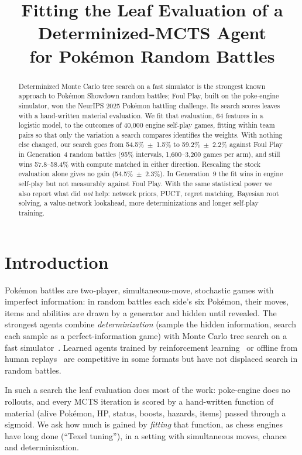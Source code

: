 \documentclass[conference]{IEEEtran}
\begin{document}
\title{Fitting the Leaf Evaluation of a Determinized-MCTS Agent\\for Pok\'emon Random Battles}
\author{}
\maketitle

\begin{abstract}
Determinized Monte Carlo tree search on a fast simulator is the strongest known approach to Pok\'emon Showdown
random battles; Foul Play, built on the poke-engine simulator, won the NeurIPS 2025 Pok\'emon battling challenge.
Its search scores leaves with a hand-written material evaluation. We fit that evaluation, 64 features in a
logistic model, to the outcomes of 40{,}000 engine self-play games, fitting within team pairs so that only the
variation a search compares identifies the weights. With nothing else changed, our search goes from
54.5\%~$\pm$~1.5\% to 59.2\%~$\pm$~2.2\% against Foul Play in Generation~4 random battles (95\% intervals,
1{,}600--3{,}200 games per arm), and still wins 57.8--58.4\% with compute matched in either direction. Rescaling
the stock evaluation alone gives no gain (54.5\%~$\pm$~2.3\%). In Generation~9 the fit wins in engine self-play but not measurably against Foul Play. With the same
statistical power we also report what did \emph{not} help: network priors, PUCT, regret matching, Bayesian root
solving, a value-network lookahead, more determinizations and longer self-play training.
\end{abstract}

\section{Introduction}
Pok\'emon battles are two-player, simultaneous-move, stochastic games with imperfect information: in random
battles each side's six Pok\'emon, their moves, items and abilities are drawn by a generator and hidden until
revealed. The strongest agents combine \emph{determinization} (sample the hidden information, search each sample as
a perfect-information game) with Monte Carlo tree search on a fast simulator~\cite{foulplay,pokeengine}.
Learned agents trained by reinforcement learning~\cite{wang2024} or offline from human replays~\cite{metamon}
are competitive in some formats but have not displaced search in random battles.

In such a search the leaf evaluation does most of the work: poke-engine does no rollouts, and every MCTS iteration
is scored by a hand-written function of material (alive Pok\'emon, HP, status, boosts, hazards, items) passed
through a sigmoid. We ask how much is gained by \emph{fitting} that function, as chess engines have long done
(``Texel tuning''), in a setting with simultaneous moves, chance and determinization.
\end{document}
